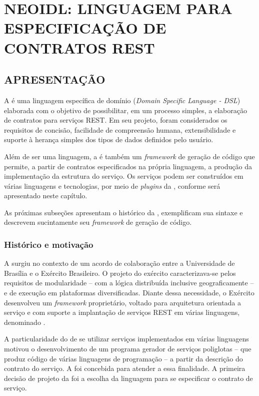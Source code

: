 \chapter{NEOIDL: LINGUAGEM PARA ESPECIFICAÇÃO DE CONTRATOS REST	}
\vspace{-6mm}


\section{APRESENTAÇÃO}
\label{apresentacaoNeoIDL}

A \neoidl{} é uma linguagem específica de domínio (\textit{Domain Specific
Language - DSL}) elaborada com o objetivo de possibilitar, em um processo
simples, a elaboração de contratos para serviços REST. Em seu projeto, 
foram considerados os requisitos de concisão, facilidade de compreensão humana,
extensibilidade e suporte à herança simples dos tipos de dados definidos pelo
usuário.

Além de ser uma linguagem, a \neoidl{} é também um \textit{framework} de geração
de código que permite, a partir de contratos especificados na própria
linguagem, a produção da implementação da estrutura do serviço. Os serviços
podem ser construídos em várias linguagens e tecnologias, por meio
de \textit{plugins} da \neoidl{}, conforme será apresentado neste capítulo.

As próximas subseções apresentam o histórico da \neoidl{}, exemplificam sua
sintaxe e descrevem sucintamente seu \textit{framework} de geração de código.


\subsection{Histórico e motivação}
\label{histMotivNeoIDL}
\vspace{-6mm}

A \neoidl{} surgiu no contexto de um acordo de colaboração entre a Universidade
de Brasília e o Exército Brasileiro. O projeto do exército caracterizava-se
pelos requisitos de modularidade -- com a lógica distribuída inclusive
geograficamente -- e de execução em plataformas diversificadas. Diante dessa
necessidade, o Exército desenvolveu um \textit{framework} proprietário,
voltado para arquitetura orientada a serviço e com suporte
a implantação de serviços REST em várias linguagens, denominado \neocortex{}.

A particularidade do \neocortex{} de se utilizar serviços implementados em
várias linguagens motivou o desenvolvimento de um programa gerador de serviços
poliglotas -- que produz código de várias linguagens de programação -- a partir da
descrição do contrato do serviço. A \neoidl{} foi concebida para atender a essa
finalidade. A primeira decisão de projeto da \neoidl{} foi a escolha da
linguagem para se especificar o contrato de serviço.

